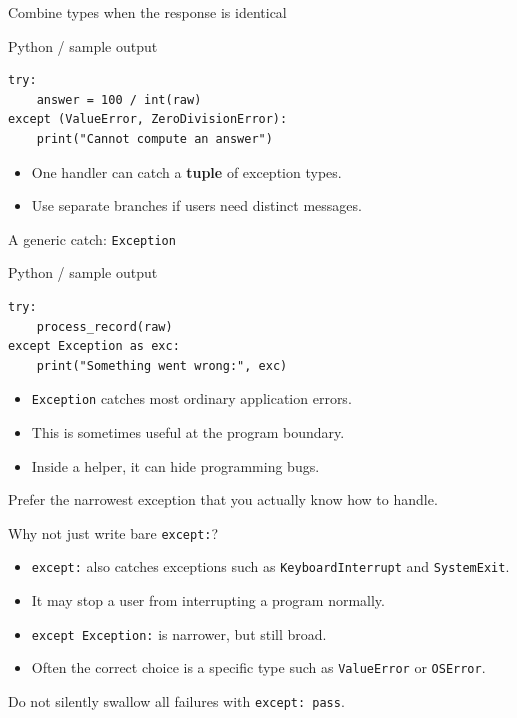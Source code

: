 \documentclass[aspectratio=169,10pt]{beamer}
\begin{document}
\begin{frame}[fragile]{Combine types when the response is identical}
\begin{block}{Python / sample output}
\begin{Verbatim}[fontsize=\footnotesize]
try:
    answer = 100 / int(raw)
except (ValueError, ZeroDivisionError):
    print("Cannot compute an answer")
\end{Verbatim}
\end{block}
\small\begin{itemize}\item One handler can catch a \textbf{tuple} of exception types.\item Use separate branches if users need distinct messages.\end{itemize}
\end{frame}
\begin{frame}[fragile]{A generic catch: \texttt{Exception}}
\begin{block}{Python / sample output}
\begin{Verbatim}[fontsize=\footnotesize]
try:
    process_record(raw)
except Exception as exc:
    print("Something went wrong:", exc)
\end{Verbatim}
\end{block}
\small\begin{itemize}\item \texttt{Exception} catches most ordinary application errors.\item This is sometimes useful at the program boundary.\item Inside a helper, it can hide programming bugs.\end{itemize}
\vspace{0.06in}\begin{keyidea}\small Prefer the narrowest exception that you actually know how to handle.\end{keyidea}
\end{frame}
\begin{frame}[fragile]{Why not just write bare \texttt{except:}?}
\begin{itemize}\item \texttt{except:} also catches exceptions such as \texttt{KeyboardInterrupt} and \texttt{SystemExit}.\item It may stop a user from interrupting a program normally.\item \texttt{except Exception:} is narrower, but still broad.\item Often the correct choice is a specific type such as \texttt{ValueError} or \texttt{OSError}.\end{itemize}
\vspace{0.06in}\begin{keyidea}\small Do not silently swallow all failures with \texttt{except: pass}.\end{keyidea}
\end{frame}
\end{document}
